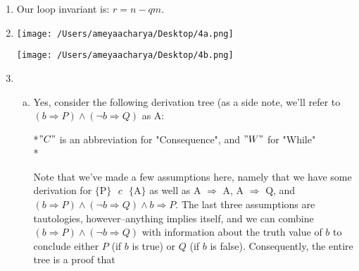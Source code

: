 \documentclass[10pt, oneside]{article}
\begin{document}
\begin{enumerate}[1.]
  \item Our loop invariant is: $r = n - qm.$

\pagebreak

    \item     \hspace{4mm}
    
    \texttt{[image: /Users/ameyaacharya/Desktop/4a.png]}
    
    \texttt{[image: /Users/ameyaacharya/Desktop/4b.png]}


  \item
  \begin{enumerate} [(a)]
    \item
      Yes, consider the following derivation tree (as a side note, we'll refer to 
  		$(b \Rightarrow P) \wedge (\neg b \Rightarrow Q)$ as A:
      
      \begin{prooftree}
        
        
      \end{prooftree}
      
      *$"C"$ is an abbreviation for "Consequence", and $"W"$ for "While" \\*
      
      Note that we've made a few assumptions here, namely that we have some 
      derivation for $\{\text{P}\} \text{ } c \text{ } \{\text{A}\}$ as well as 
      A $\Rightarrow$ A, A $\Rightarrow$ Q, and $(b \Rightarrow P) \wedge (\neg b 
      \Rightarrow Q) \wedge b \Rightarrow P$. The last three assumptions are 
      tautologies, however--anything implies itself, and we can combine $(b 
      \Rightarrow P) \wedge (\neg b \Rightarrow Q)$ with information about the
      truth value of $b$ to conclude either $P$ (if $b$ is true) or $Q$ (if $b$ 
      is false). Consequently, the entire tree is a proof that 
      

\end{enumerate}
\end{enumerate}
\end{document}

